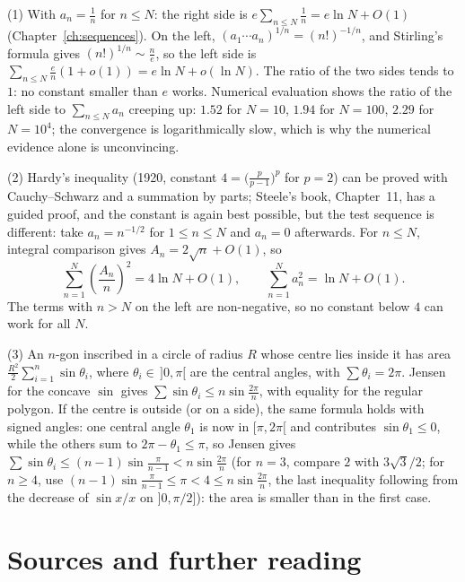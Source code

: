 (1) With $a_n=\frac1n$ for $n\le N$: the right side is $e\sum_{n\le N}\frac1n=e\ln N+O(1)$ (Chapter~\ref{ch:sequences}). On the left, $(a_1\cdots a_n)^{1/n}=(n!)^{-1/n}$, and Stirling's formula gives $(n!)^{1/n}\sim\frac ne$, so the left side is $\sum_{n\le N}\frac en(1+o(1))=e\ln N+o(\ln N)$. The ratio of the two sides tends to $1$: no constant smaller than $e$ works. Numerical evaluation shows the ratio of the left side to $\sum_{n\le N}a_n$ creeping up: $1.52$ for $N=10$, $1.94$ for $N=100$, $2.29$ for $N=10^4$; the convergence is logarithmically slow, which is why the numerical evidence alone is unconvincing.

(2) Hardy's inequality (1920, constant $4=\bigl(\frac p{p-1}\bigr)^p$ for $p=2$) can be proved with Cauchy--Schwarz and a summation by parts; Steele's book, Chapter~11, has a guided proof, and the constant is again best possible, but the test sequence is different: take $a_n=n^{-1/2}$ for $1\le n\le N$ and $a_n=0$ afterwards. For $n\le N$, integral comparison gives $A_n=2\sqrt n+O(1)$, so
\[
\sum_{n=1}^N\left(\frac{A_n}{n}\right)^2=4\ln N+O(1),
\qquad
\sum_{n=1}^N a_n^2=\ln N+O(1).
\]
The terms with $n>N$ on the left are non-negative, so no constant below $4$ can work for all $N$.

(3) An $n$-gon inscribed in a circle of radius $R$ whose centre lies inside it has area $\frac{R^2}2\sum_{i=1}^n\sin\theta_i$, where $\theta_i\in\,]0,\pi[$ are the central angles, with $\sum\theta_i=2\pi$. Jensen for the concave $\sin$ gives $\sum\sin\theta_i\le n\sin\frac{2\pi}n$, with equality for the regular polygon. If the centre is outside (or on a side), the same formula holds with signed angles: one central angle $\theta_1$ is now in $[\pi,2\pi[$ and contributes $\sin\theta_1\le0$, while the others sum to $2\pi-\theta_1\le\pi$, so Jensen gives $\sum\sin\theta_i\le(n-1)\sin\frac{\pi}{n-1}<n\sin\frac{2\pi}n$ (for $n=3$, compare $2$ with $3\sqrt3/2$; for $n\ge4$, use $(n-1)\sin\frac\pi{n-1}\le\pi<4\le n\sin\frac{2\pi}n$, the last inequality following from the decrease of $\sin x/x$ on $]0,\pi/2]$): the area is smaller than in the first case.

\section*{Sources and further reading}

